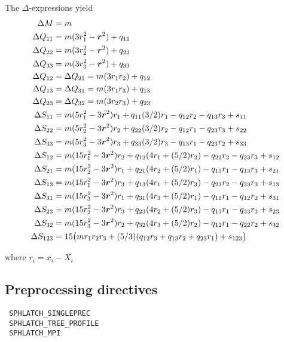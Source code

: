 The $\Delta$-expressions yield
\begin{align*}
\Delta M &= m \\
\Delta Q_{11} &= m (3 r_1^2 - \boldsymbol{r}^2) + q_{11} \nonumber \\
\Delta Q_{22} &= m (3 r_2^2 - \boldsymbol{r}^2) + q_{22} \nonumber \\
\Delta Q_{33} &= m (3 r_3^2 - \boldsymbol{r}^2) + q_{33} \nonumber \\
\Delta Q_{12} &= \Delta Q_{21} = m ( 3 r_1 r_2 ) + q_{12} \nonumber \\
\Delta Q_{13} &= \Delta Q_{31} = m ( 3 r_1 r_3 ) + q_{13} \nonumber \\
\Delta Q_{23} &= \Delta Q_{32} = m ( 3 r_2 r_3 ) + q_{23} \nonumber \\
\Delta S_{11} &= m ( 5 r_1^2 - 3 \boldsymbol{r}^2 ) r_1 + q_{11} (3/2) r_1 - q_{12} r_2 - q_{13} r_3 + s_{11} \nonumber \\
\Delta S_{22} &= m ( 5 r_2^2 - 3 \boldsymbol{r}^2 ) r_2 + q_{22} (3/2) r_2 - q_{12} r_1 - q_{23} r_3 + s_{22} \nonumber \\
\Delta S_{33} &= m ( 5 r_3^2 - 3 \boldsymbol{r}^2 ) r_3 + q_{33} (3/2) r_3 - q_{13} r_1 - q_{23} r_2 + s_{33} \nonumber \\
\Delta S_{12} &= m ( 15 r_1^2 - 3 \boldsymbol{r}^2 ) r_2 + q_{12} ( 4 r_1 + (5/2) r_2) - q_{22} r_2 - q_{23} r_3 + s_{12} \\
\Delta S_{21} &= m ( 15 r_2^2 - 3 \boldsymbol{r}^2 ) r_1 + q_{21} ( 4 r_2 + (5/2) r_1) - q_{11} r_1 - q_{13} r_3 + s_{21} \\
\Delta S_{13} &= m ( 15 r_1^2 - 3 \boldsymbol{r}^2 ) r_3 + q_{13} ( 4 r_1 + (5/2) r_3) - q_{23} r_2 - q_{33} r_3 + s_{13} \\
\Delta S_{31} &= m ( 15 r_3^2 - 3 \boldsymbol{r}^2 ) r_1 + q_{31} ( 4 r_3 + (5/2) r_1) - q_{11} r_1 - q_{12} r_2 + s_{31} \\
\Delta S_{23} &= m ( 15 r_2^2 - 3 \boldsymbol{r}^2 ) r_3 + q_{23} ( 4 r_2 + (5/2) r_3) - q_{13} r_1 - q_{33} r_3 + s_{23} \\
\Delta S_{32} &= m ( 15 r_3^2 - 3 \boldsymbol{r}^2 ) r_2 + q_{32} ( 4 r_3 + (5/2) r_2) - q_{12} r_1 - q_{22} r_2 + s_{32} \\
\Delta S_{123} &=15 \big( m r_1 r_2 r_3 + (5 / 3) ( q_{12}  r_3 + q_{13} r_2 + q_{23} r_1) + s_{123} \big)
\end{align*}

where $r_i = x_i - X_i$

\subsection{Preprocessing directives}
\verb| SPHLATCH_SINGLEPREC | \\
\verb| SPHLATCH_TREE_PROFILE |\\
\verb| SPHLATCH_MPI |\\

